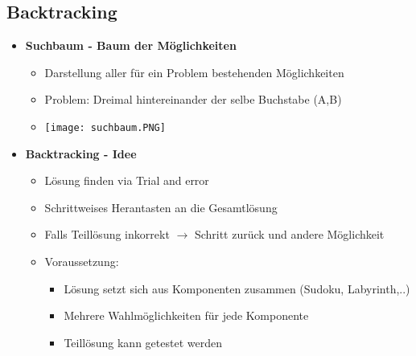 \pagebreak

\subsection{Backtracking}
    \begin{itemize}
        \item \textbf{Suchbaum - Baum der Möglichkeiten}
            \begin{itemize}
                \item Darstellung aller für ein Problem bestehenden Möglichkeiten
                \item Problem: Dreimal hintereinander der selbe Buchstabe (A,B)
                \item[] \texttt{[image: suchbaum.PNG]}
            \end{itemize}

        \item \textbf{Backtracking - Idee}
            \begin{itemize}
                \item Lösung finden via Trial and error
                \item Schrittweises Herantasten an die Gesamtlösung
                \item Falls Teillösung inkorrekt $\rightarrow$ Schritt zurück und andere Möglichkeit
                \item Voraussetzung:
                    \begin{itemize}
                        \item Lösung setzt sich aus Komponenten zusammen (Sudoku, Labyrinth,..)
                        \item Mehrere Wahlmöglichkeiten für jede Komponente
                        \item Teillösung kann getestet werden
                    \end{itemize}
            \end{itemize}


\end{itemize}
